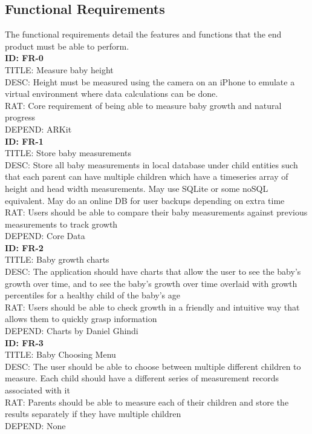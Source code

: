 \documentclass[letterpaper,10pt,draftclsnofoot,onecolumn,compsoc]{IEEEtran}
\begin{document}
\subsection{Functional Requirements}
\begin{singlespace}
\noindent
The functional requirements detail the features and functions that the end product must be able to perform.\\

\textbf{ID: FR-0}\\
TITLE: Measure baby height\\
DESC: Height must be measured using the camera on an iPhone to emulate a virtual environment where data calculations can be done.\\
RAT: Core requirement of being able to measure baby growth and natural progress\\
DEPEND: ARKit\\


\textbf{ID: FR-1}\\
TITLE: Store baby measurements\\
DESC: Store all baby measurements in local database under child entities such that each parent can have multiple children which have a timeseries array of height and head width measurements. May use SQLite or some noSQL equivalent. May do an online DB for user backups depending on extra time\\
RAT: Users should be able to compare their baby measurements against previous measurements to track growth\\
DEPEND: Core Data\\

\textbf{ID: FR-2}\\
TITLE: Baby growth charts\\
DESC: The application should have charts that allow the user to see the baby's growth over time, and to see the baby's growth over time overlaid with growth percentiles for a healthy child of the baby's age\\
RAT: Users should be able to check growth in a friendly and intuitive way that allows them to quickly grasp information\\
DEPEND: Charts by Daniel Ghindi\\

\textbf{ID: FR-3}\\
TITLE: Baby Choosing Menu\\
DESC: The user should be able to choose between multiple different children to measure. Each child should have a different series of measurement records associated with it\\
RAT: Parents should be able to measure each of their children and store the results separately if they have multiple children\\
DEPEND: None\\
\end{singlespace}
\end{document}
